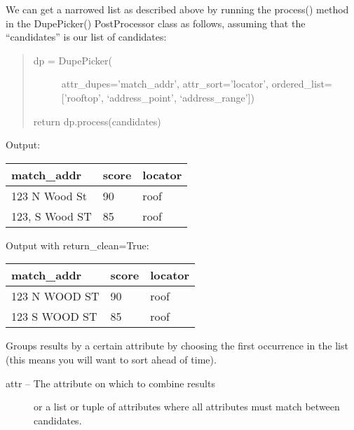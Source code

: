 \documentclass[letterpaper,10pt,english]{sphinxmanual}
\begin{document}
\begin{fulllineitems}
We can get a narrowed list as described above by running the process()
method in the DupePicker() PostProcessor class as follows, assuming
that the ``candidates'' is our list of candidates:
\begin{quote}
\begin{description}
\item[{dp = DupePicker(}] \leavevmode
attr\_dupes='match\_addr',
attr\_sort='locator',
ordered\_list={[}'rooftop', `address\_point', `address\_range'{]})

\end{description}

return dp.process(candidates)
\end{quote}

Output:

\begin{tabulary}{\linewidth}{|L|L|L|}
\hline

match\_addr
 & 
score
 & 
locator
\\\hline

123 N Wood St
 & 
90
 & 
roof
\\\hline

123, S Wood ST
 & 
85
 & 
roof
\\\hline
\end{tabulary}


Output with return\_clean=True:

\begin{tabulary}{\linewidth}{|L|L|L|}
\hline

match\_addr
 & 
score
 & 
locator
\\\hline

123 N WOOD ST
 & 
90
 & 
roof
\\\hline

123 S WOOD ST
 & 
85
 & 
roof
\\\hline
\end{tabulary}


\end{fulllineitems}


\begin{fulllineitems}
\label{index:omgeo.processors.postprocessors.GroupBy}
Groups results by a certain attribute by choosing the
first occurrence in the list (this means you will want
to sort ahead of time).
\begin{description}
\item[{attr   --  The attribute on which to combine results}] \leavevmode
or a list or tuple of attributes where all
attributes must match between candidates.

\end{description}

\end{fulllineitems}
\end{document}
